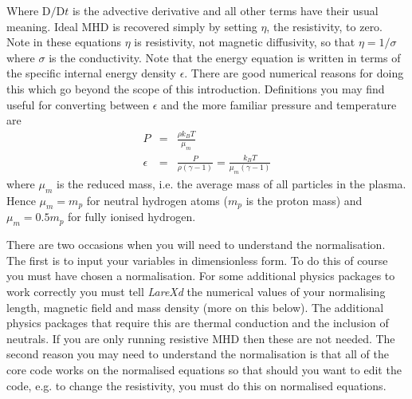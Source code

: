 \documentclass[11pt]{article}
\begin{document}
Where $\mathrm{D}/\mathrm{D}t$ is the advective derivative and all other terms have their usual meaning. Ideal MHD is recovered simply by setting $\eta$, the resistivity, to zero. Note in these equations $\eta$ is resistivity, not magnetic diffusivity, so that $\eta=1/\sigma$ where $\sigma$ is the conductivity. Note that the energy equation is written in terms of the specific internal energy density $\epsilon$. There are good numerical reasons for doing this which go beyond the scope of this introduction. Definitions you may find useful for converting between $\epsilon$ and the more familiar pressure and temperature are
\begin{eqnarray*}
P&=&\frac{\rho k_{B}T}{\mu_m}\\
\epsilon&=&\frac{P}{\rho(\gamma-1)}=\frac{k_B T}{\mu_m (\gamma-1)}
\end{eqnarray*}
where $\mu_m$ is the reduced mass, i.e. the average mass of all particles in the plasma. Hence $\mu_m=m_p$ for neutral hydrogen atoms ($m_p$ is the proton mass) and $\mu_m=0.5 m_p$ for fully ionised hydrogen. 

There are two occasions when you will need to understand the normalisation. The first is to input your variables in dimensionless form. To do this of course you must have chosen a normalisation. For some additional physics packages to work correctly you must tell {\it LareXd} the numerical values of your normalising length, magnetic field and mass density (more on this below). The additional physics packages that require this are thermal conduction and the inclusion of neutrals. If you are only running resistive MHD then these are not needed. The second reason you may need to understand the normalisation is that all of the core code works on the normalised equations so that should you want to edit the code, e.g. to change the resistivity, you must do this on normalised equations.  
 
\end{document}
